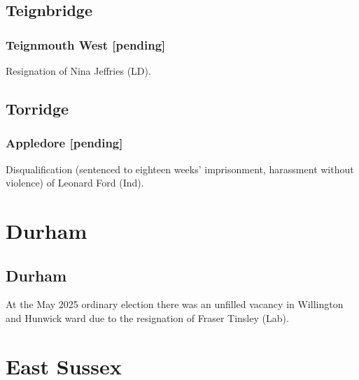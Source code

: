 \documentclass[a4paper,openany]{book}
\begin{document}
\begin{resultsiii}
\subsection*{Teignbridge}

\subsubsection*{Teignmouth West \hspace*{\fill}\nolinebreak[1]%
	\enspace\hspace*{\fill}
	[pending]}


Resignation of Nina Jeffries (LD).

\subsection*{Torridge}

\subsubsection*{Appledore \hspace*{\fill}\nolinebreak[1]%
	\enspace\hspace*{\fill}
	[pending]}


Disqualification (sentenced to eighteen weeks' imprisonment, harassment without violence) of Leonard Ford (Ind).

\section{Durham}

\subsection*{Durham}

At the May 2025 ordinary election there was an unfilled vacancy in Willington and Hunwick ward due to the resignation of Fraser Tinsley (Lab).%

\section{East Sussex}


\end{resultsiii}
\end{document}
